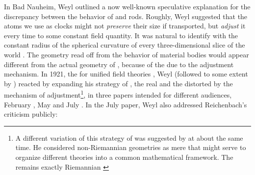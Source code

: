 \documentclass[final]{article}
\begin{document}
In Bad Nauheim, Weyl outlined a now well-known speculative explanation for the discrepancy between the behavior of  and  rods. Roughly, Weyl suggested that the atoms we use as clocks might not \emph{preserve} their size if transported, but \emph{adjust} it every time to some constant field quantity. It was natural to identify with the constant radius of the spherical curvature of every three-dimensional slice of the world \citep{Weyl1920a}. The geometry read off from the behavior of material bodies would appear different from the actual geometry of \spti, because of the  due to the adjustment mechanism. In 1921, the  for unified field theories \citep[ch.\ 4]{Vizgin1994}, Weyl (followed to some extent by \cite{Eddington1921,Eddington1921a}) reacted by expanding his strategy of , the real  and the  distorted by the mechanism of adjustment\footnote{A different variation of this strategy of  was suggested by \citet{Eddington1921} at about the same time. He considered non-Riemannian geometries as mere  that might serve to organize different theories into a common mathematical framework. The  remains exactly Riemannian \citep{Eddington1921}}, in three papers intended for different audiences, February \citep{Weyl1921a}, May \citep{Weyl1921d} and July \citep{Weyl1921e}. In the July paper, Weyl also addressed Reichenbach's criticism publicly:
\end{document}
